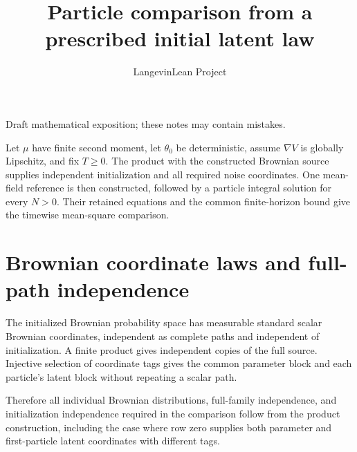 \documentclass[11pt,a4paper]{article}
\title{\texorpdfstring{Particle comparison from a prescribed initial latent law}{Particle comparison from a prescribed initial latent law}}
\author{LangevinLean Project}
\date{}
\begin{document}
\maketitle
Draft mathematical exposition; these notes may contain mistakes.


Let \(\mu\) have finite second moment, let \(\theta_0\) be deterministic, assume \(\nabla V\) is globally Lipschitz, and fix \(T\ge0\). The product with the constructed Brownian source supplies independent initialization and all required noise coordinates. One mean-field reference is then constructed, followed by a particle integral solution for every \(N>0\). Their retained equations and the common finite-horizon bound give the timewise mean-square comparison.


\section{\texorpdfstring{Brownian coordinate laws and full-path independence}{Brownian coordinate laws and full-path independence}}


The initialized Brownian probability space has measurable standard scalar Brownian coordinates, independent as complete paths and independent of initialization. A finite product gives independent copies of the full source. Injective selection of coordinate tags gives the common parameter block and each particle’s latent block without repeating a scalar path.



Therefore all individual Brownian distributions, full-family independence, and initialization independence required in the comparison follow from the product construction, including the case where row zero supplies both parameter and first-particle latent coordinates with different tags.
\end{document}
